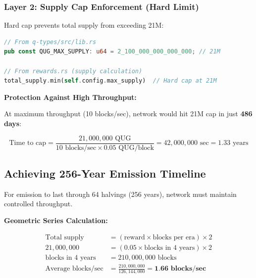 \documentclass[11pt,a4paper]{article}
\begin{document}
\subsubsection{Layer 2: Supply Cap Enforcement (Hard Limit)}

Hard cap prevents total supply from exceeding 21M:

\begin{lstlisting}[language=Rust]
// From q-types/src/lib.rs
pub const QUG_MAX_SUPPLY: u64 = 2_100_000_000_000_000; // 21M

// From rewards.rs (supply calculation)
total_supply.min(self.config.max_supply)  // Hard cap at 21M
\end{lstlisting}

\textbf{Protection Against High Throughput:}

At maximum throughput (10 blocks/sec), network would hit 21M cap in just \textbf{486 days}:

\begin{equation}
\text{Time to cap} = \frac{21,000,000 \text{ QUG}}{10 \text{ blocks/sec} \times 0.05 \text{ QUG/block}} = 42,000,000 \text{ sec} = 1.33 \text{ years}
\end{equation}

\subsection{Achieving 256-Year Emission Timeline}

For emission to last through 64 halvings (256 years), network must maintain controlled throughput.

\textbf{Geometric Series Calculation:}

\begin{align*}
\text{Total supply} &= (\text{reward} \times \text{blocks per era}) \times 2 \\
21,000,000 &= (0.05 \times \text{blocks in 4 years}) \times 2 \\
\text{blocks in 4 years} &= 210,000,000 \text{ blocks} \\
\text{Average blocks/sec} &= \frac{210,000,000}{126,144,000} = \textbf{1.66 blocks/sec}
\end{align*}
\end{document}
